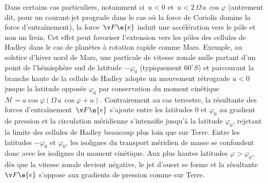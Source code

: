 \sk 
Dans certains cas particuliers, notamment si~$u<0$ et~$u<2 \, \Omega \, a \, \cos \varphi$ (autrement dit, pour un courant-jet prograde dans le cas où la force de Coriolis domine la force d'entraînement), la force~$\v F\e{e}$ induit une accélération vers le pôle et non un frein. Cet effet peut favoriser l'extension vers les pôles des cellules de Hadley dans le cas de planètes à rotation rapide comme Mars. Exemple, au solstice d'hiver nord de Mars, une particule de vitesse zonale nulle partant d'un point de l'hémisphère sud de latitude $-\varphi_0$ (typiquement $60^{\circ}S$) et parcourant la branche haute de la cellule de Hadley adopte un mouvement rétrograde $u<0$ jusque la latitude opposée $\varphi_0$ par conservation du moment cinétique $\mathcal{M} = a \cos \varphi \left( \Omega \, a \, \cos \varphi + u \right)$. Contrairement au cas terrestre, la résultante des forces d'entraînement~$\v F\e{e}$ s'ajoute entre les latitudes $0$ et $\varphi_0$ au gradient de pression et la circulation méridienne s'intensifie jusqu'à la latitude $\varphi_0$, rejetant la limite des cellules de Hadley beaucoup plus loin que sur Terre. Entre les latitudes $-\varphi_0$ et $\varphi_0$, les isolignes du transport méridien de masse se confondent donc avec les isolignes du moment cinétique. Aux plus hautes latitudes $\varphi > \varphi_0$, dès que la vitesse zonale devient négative, le jet d'ouest se forme et la résultante~$\v F\e{e}$ s'oppose aux gradients de pression comme sur Terre.







